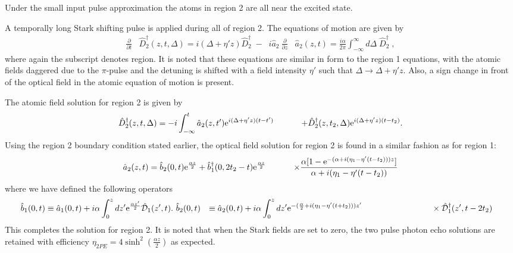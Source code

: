                                                                                                                                                                                                                                                                                                                                                                                                                                                                                                                                                                                                                                                                                                                                                                                                                                                                                                                                                                                                                                                                                                                                                                                                                                                                                                                                                                                                                                                                                                                                                                                                                                                                                                                                                                                                                                                                                                                                                                                                                                                                                                                                                                                                                                                                                                                                                                                                                                                                                                                                                                                                                                                                                                                                                                                                                                                                                                                                                                                                                                                                                                                                                                                                                                                                                                                                                                                                                                                                                                                                                                                                                                                                                                                                                                                                                                                                                                                                                                                                                                                                                                                                                                                                                                                                                                                                                                                                                                                                                                                                                                                                                                                                                                                                                                                                                                                                                                                                                                                                                                                                                                                                                                                                                                                                                                                                                                                                                                                                                                                                                                                                                                                                                                                                                                                                                                                                                                                                                                                                                                                                                                                                                                                                                                                                                                                                                                                                                                                                                                                                                                                                                                                                                                                                                                                                                                                                                                                                                                                                                                                                                                                                                                                                                                                                                                                                                                                                                                                                                                                                                                                                                                                                                                                                                                                                                                                                                                                                                                                                                                                                                                                                                                                                                                                                                                                                                                                                                                                                                                                                                                                                                                                                                                                                                                                                                                                                                                                                                                                                                                                                                                                                                                                                                                                                                                                                                                                                                                                                                                                                                                                                                                                                                                                                                                                                                                                                                                                                                                                                                                                                                                                                                                                                                                                                                                                                                                                                                                                                                                                                                                                                                                                                                                                                                                                                                                                                                                                                                                                                                                                                                                                                                                                                                                                                                                                                                                                                                                                                                                                                                                                                                                                                                                                                                                                                                                                                                                                                                                                                                                                                                                                                                                                                                                                                                                                                                                                                                                                                                                                                                                                                                                                                                                                                                                                                                                                                                                                                                                                                                                                                                                                                                                                                                                                                                                                                                                                                                                                                                                                                                                                                                                                                                                                                                                                                                                                                                                                                                                                                                                                                                                                                                                                                                                                                                                                                                                                                                                                                                                                                                                                                                                                                                                                                                                                                                                                                                                                                                                                                                                                                                                                                                                                                                                                                                                                                                                                                                                                                                                                                                                                                                                                                                                                                                                                                                                                                                                                                                                                                                                                                                                                                                                                                                                                                                                                                                                                                                                                                                                                                                                                                                                                                                                                                                                                                                                                                                                                                                                                                                                                                                                                                                                                                                                                                                                                                                                                                                                                                                                                                                                                                                                                                                                                                                                                                                                                                                                                                                                                                                                                                                                                                                                                                                                                                                                                                                                                                                                                                                                                                                                                                                                                                                                                                                                                                                                                                                                                                                                                                                                                                                                                                                                                                                                                                                                                                                                                                                                                                                                                                                                                                                                                                                                                                                                                                                                                                                                                                                                                                                                                                                                                                                                                                                                                                                                                                                                                                                                                                                                                                                                                                                                                                                                                                                                                                                                                                                                                                                                                                                                                                                                                                                                                                                                                                                                                                                                                                                                                                                                                                                                                                                                                                                                                                                                                                                                                                                                                                                                                                                                                                                                                                                                                                                                                                                                                                                                                                                                                                                                                                                                                                                                                                                                                                                                                                                                                                                                                                                                                                                                                                                                                                                                                                                                                                                                                                                                                                                                                                                                                                                                                                                                                                                                                                                                                                                                                                                                                                                                                                                                                                                                                                                                                                                                                                                                                                                                                                                                                                                                                                                                                                                                                                                                                                                                                                                                                                                                                                                                                                                                                                                                                                                                                                                                                                                                                                                                                                                                                                                                                                                                                                                                                                                                                                                                                                                                                                                                                                                                                                                                                                                                                                                                                                                                                                                                                                                                                                                                                                                                                                                                                                                                                                                                                                                                                                                                                                                                                                                                                                                                                                                                                                                                                                                                                                                                                                                                                                                                                                                                                                                                                                                                                                                                                                                                                                                                                                                                                                                                                                                                                                                                                                                                                                                                                                                                                                                                                                                                                                                                                                                                                                                                                                                                                                                                                                                                                                                                                                                                                                                                                                                                                                                                                                                                                                                                                                                                                                                                                                                                                                                                                                                                                                                                                                                                                                                                                                                                                                                                                                                                                                                                                                                                                                                                                                                                                                                                                                                                                                                                                                                                                                                                                                                                                                                                                                                                                                                                                                                                                                                                                                                                                                                                                                                                                                                                                                                                                                                                                                                                                                                                                                                                                                                                                                                                                                                                                                                                                                                                                                                                                                                                                                                                                                                                                                                                                                                                                                                                                                                                                                                                                                                                                                                                                                                                                                                                                                                                                                                                                                                                                                                                                                                                                                                                                                                                                                                                                                                                                                                                                                                                                                                                                                                                                                                                                                                                                                                                                                                                                                                                                                                                                                                                                                                                                                                                                                                                                                                                                                                                                                                                                                                                                                                                                                                                                                                                                                                                                                                                                                                                                                                                                                                                                                                                                                                                                                                                                                                                                                                                                                                                                                                                                                                                                                                                                                                                                                                                                                                                                                                                                                                                                                                                                                                                                                                                                                                                                                                                                                                                                                                                                                                                                                                                                                                                                                                                                                                                                                                                                                                                                                                                                                                                                                                                                                                                                                                                                                                                                                                                                                                                                                                                                                                                                                                                                                                                                                                                                                                                                                                                                                                                                                                                                                                                                                                                                                                                                                                                                                                                                                                                                                                                                                                                                                                                                                                                                                                                                                                                                                                                                                                                                                                                                                                                                                                                                                                                                                                                                                                                                                                                                                                                                                                                                                                                                                                                                                                                                                                                                                                                                                                                                                                                                                                                                                                                                                                                                                                                                                                                                                                                                                                                                                                                                                                                                                                                                                                                                                                                                                                                                                                                                                                                                                                                                                                                                                                                                                                                                                                                                                                                                                                                                                                                                                                                                                                                                                                                                                                                                                                                                                                                                                                                                                                                                                                                                                                                                                                                                                                                                                                                                                                                                                                                                                                                                                                                                                                                                                                                                                                                                                                                                                                                                                                                                                                                                                                                                                                                                                                                                                                                                                                                                                                                                                                                                                                                                                                                                                                                                                                                                                                                                                                                                                                                                                                                                                                                                                                                                                                                                                                                                                                                                                                                                                                                                                                                                                                                                                                                                                                                                                                                                                                                                                                                                                                                                                                                                                                                                                                                                                                                                                                                                                                                                                                                                                                                                                                                                                                                                                                                                                                                                                                                                                                                                                                                                                                                                                                                                                                                                                                                                                                                                                                                                                                                                                                                                                                                                                                                                                                                                                                                                                                                                                                                                                                                                                                                                                                                                                                                                                                                                                                                                                                                                                                                                                                                                                                                                                                                                                                                                                                                                                                                                                                                                                                                                                                                                                                                                                                                                                                                                                                                                                                                                                                                                                                                                                                                                                                                                                                                                                                                                                                                                                                                                                                                                                                                                                                                                                                                                                                                                                                                                                                                                                                                                                                                                                                                                                                                                                                                                                                                                                                                                                                                                                                                                                                                                                                                                                                                                                                                                                                                                                                                                                                                                                                                                                                                                                                                                                                                                                                                                                                                                                                                                                                                                                                                                                                                                                                                                                                                                                                                                                                                                                                                                                                                                                                                                                                                                   \documentclass[superscriptaddress,pra,twocolumn,showpacs,amsmath,amssymb,aps,a4paper]{revtex4}
\begin{document}
Under the small input pulse approximation the atoms in region 2 are
all near the excited state.

 A temporally long Stark shifting pulse is applied during all of
 region 2. The equations of motion are given by
\begin{subequations}
 \label{equ:excitedMBE}
 \begin{align}
  \label{equ:MBE1R2}
  \frac{\partial}{\partial t} & \hat{D}_{2}^{\dagger}(z,t,\Delta) = i (\Delta + \eta' z) \hat{D}_{2}^{\dagger} \; -  \;\; i \hat{a}_{2} \

  \label{equ:MBE2R2}
  \frac{\partial}{\partial z} & \hat{a}_{2}(z,t) = \frac{i \alpha}{2 \pi} \int_{-\infty}^{\infty} d\Delta \;   \hat{D}_{2}^{\dagger} \;,
 \end{align}
 \end{subequations}
 where again the subscript denotes region. It is noted that these equations are similar in form to the region 1 equations, with the atomic fields daggered due to the $\pi$-pulse and the detuning is shifted with a field intensity $\eta'$ such that $\Delta \to \Delta + \eta' z$. Also, a sign change in front of the optical field in the atomic equation of motion is present.
 
 The atomic field solution for region 2 is given by
 \begin{align}
 \hat{D}^\dagger_2(z,t,\Delta) &= -i\int^t_{-\infty}\hat{a}_2(z,t')\text{e}^{i(\Delta+\eta' z)(t-t')}\notag \

 & \qquad+ \hat{D}^{\dagger}_2(z,t_2,\Delta)\text{e}^{i(\Delta + \eta' z)(t-t_2)}.
 \end{align}
Using the region 2 boundary condition stated earlier, the optical field solution for region 2 is found in a similar fashion as for region 1:
\begin{align}
\hat{a}_2(z,t) &= \hat{b}_2(0,t)\text{e}^{\frac{\alpha z}{2}} + \hat{b}^\dagger_1(0,2t_2-t) \text{e}^{\frac{\alpha z}{2}} \notag \

&\qquad \times \frac{\alpha [ 1 - \text{e}^{-(\alpha + i(\eta_1 - \eta' (t-t_2)))z}]}{\alpha +i (\eta_1 - \eta'(t-t_2))} 
\end{align}
where we have defined the following operators 
\begin{align}
\hat{b}_1(0,t) &\equiv \hat{a}_1(0,t) + i\alpha \int^z_0 dz' \text{e}^{\frac{\alpha z'}{2}} \hat{\mathcal{D}}_1(z',t) .\notag \

\hat{b}_2(0,t) &\equiv \hat{a}_2(0,t) + i\alpha\int^z_0 dz' \text{e}^{-(\frac{\alpha}{2} + i(\eta_1 - \eta' (t +t_2)))z'} \notag \

& \qquad\qquad\qquad\qquad \times\hat{\mathcal{D}}^\dagger_1(z',t-2t_2) \notag  
\end{align}
This completes the solution for region 2. It is noted that when the Stark fields are set to zero, the two pulse photon echo solutions are retained with efficiency $\eta_{2PE} = 4\sinh^2(\frac{\alpha z}{2})$ as expected.
\end{document}

